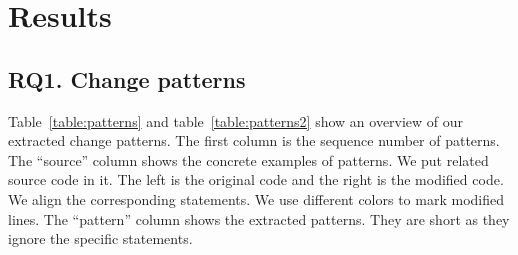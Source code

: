 \section{Results}
\label{sec:result}
\subsection{RQ1. Change patterns}
\label{sec:result:pattern}






Table~\ref{table:patterns} and table~\ref{table:patterns2} show an overview of our extracted change patterns. The first column is the sequence number of patterns. The ``source'' column shows the concrete examples of patterns. We put related source code in it. The left is the original code and the right is the modified code. We align the corresponding statements. We use different colors to mark modified lines. The ``pattern'' column shows the extracted patterns. They are short as they ignore the specific statements.

